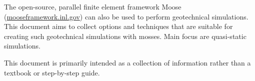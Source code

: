 The open-source, parallel finite element framework Moose (\url{mooseframework.inl.gov})
can also be used to perform geotechnical simulations. This document aims to collect
options and techniques that are suitable for creating such geotechnical simulations
with mosses. Main focus are quasi-static simulations.

This document is primarily intended as a collection of information rather than a
textbook or step-by-step guide.